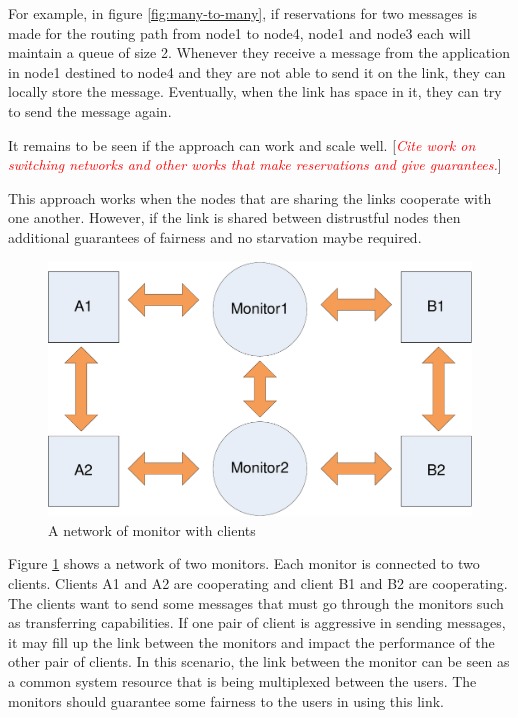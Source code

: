 \documentclass[a4paper,twoside]{report} %
\newcommand{\note}[1]{[\textcolor{red}{\textit{#1}}]}
\begin{document}
For example, in figure \ref{fig:many-to-many},
if reservations for two messages is made for the routing path
from node1 to node4, node1 and node3 each will maintain a queue of size 2.
Whenever they receive a message from the application in node1 destined to node4
and they are not able to send it on the link,
they can locally store the message.
Eventually, when the link has space in it,
they can try to send the message again.

It remains to be seen if the approach can work and scale well.
\note{Cite work on switching networks and other works that make reservations and
  give guarantees.}

This approach works when the nodes that are sharing the links
cooperate with one another.
However, if the link is shared between distrustful
nodes then additional guarantees of fairness and no starvation maybe required.

\begin{figure}[t]
 \includegraphics[width=\columnwidth]{client-monitor.pdf}
 \caption{A network of monitor with clients}\label{fig:client-monitor}
\end{figure}

Figure \ref{fig:client-monitor} shows a network of two monitors.
Each monitor is connected to two clients.
Clients A1 and A2 are cooperating and client B1 and B2 are cooperating.
The clients want to send some messages that must go through the monitors such as
transferring capabilities.
If one pair of client is aggressive in sending messages,
it may fill up the link between the monitors and impact the performance
of the other pair of clients.
In this scenario, the link between the monitor can be seen
as a common system resource that is being multiplexed between the users.
The monitors should guarantee some fairness to the users in using this link.
\end{document}
